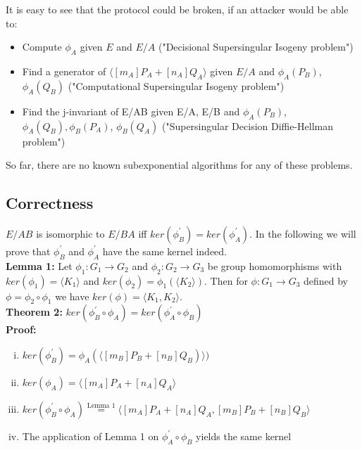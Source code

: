 	It is easy to see that the protocol could be broken, if an attacker would be able to:
	
	\begin{itemize}[\textbullet]
		\item Compute $\phi_A$ given $E$ and $E/A$ ("Decisional Supersingular Isogeny problem")
		\item Find a generator  of $\langle[m_A]P_A + [n_A]Q_A\rangle$ given $E/A$ and $\phi_A(P_B)$, $\phi_A(Q_B)$ ("Computational Supersingular Isogeny problem")
		\item Find the j-invariant of E/AB given E/A, E/B and $\phi_A(P_B)$, $\phi_A(Q_B),\phi_B(P_A)$, $\phi_B(Q_A)$ ("Supersingular Decision Diffie-Hellman problem")
	\end{itemize}

So far, there are no known subexponential algorithms for any of these problems.


\subsection{Correctness}
\label{ch:correctness}

$E/AB$ is isomorphic to $E/BA$ iff $ker(\phi_B^{\prime})=ker(\phi_A^{\prime})$. %
In the following we will prove that $\phi_B^{\prime}$ and $\phi_A^{\prime}$ have the same kernel indeed.\\

\textbf{Lemma 1:} Let $\phi_1: G_1 \to G_2$ and $\phi_2: G_2 \to G_3$ be group homomorphisms with $ker(\phi_1) = \langle K_1 \rangle$ and $ker(\phi_2) = \phi_1(\langle K_2 \rangle)$. Then for $\phi:G_1 \to G_3$ defined by $\phi=\phi_2 \circ \phi_1$ we have $ker(\phi) =\langle K_1,K_2\rangle$.\\%

\textbf{Theorem 2:} $ker(\phi_B^{\prime} \circ \phi_A) = ker(\phi_A^{\prime} \circ \phi_B)$\\
\textbf{Proof:}
\begin{enumerate}[(i)]
	\item $ker(\phi_B^{\prime})=\phi_A(\langle [m_B]P_B + [n_B]Q_B)\rangle)$
	\item $ker(\phi_A)=\langle [m_A]P_A + [n_A]Q_A\rangle$
	\item $ker(\phi_B^{\prime} \circ \phi_A) \stackrel{\text{Lemma 1}}{=} \langle [m_A]P_A + [n_A]Q_A, [m_B]P_B + [n_B]Q_B \rangle$
	\item The application of Lemma 1 on $\phi_A^{\prime} \circ \phi_B$ yields the same kernel
\end{enumerate}



